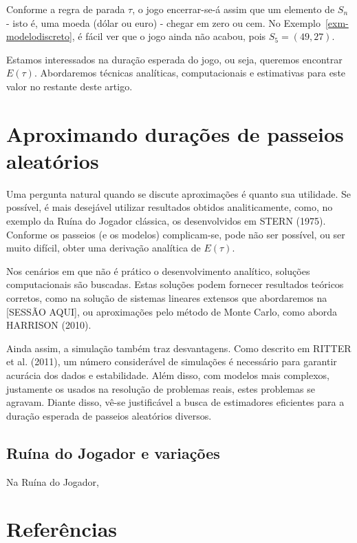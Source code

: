 \documentclass[
  brazilian,
  12pt,
]{article}
\theoremstyle{definition}
\theoremstyle{definition}
\theoremstyle{remark}
\begin{document}
Conforme a regra de parada \(\tau\), o jogo encerrar-se-á assim que um
elemento de \(S_n\) - isto é, uma moeda (dólar ou euro) - chegar em zero
ou cem. No Exemplo~\ref{exm-modelodiscreto}, é fácil ver que o jogo
ainda não acabou, pois \(S_5 = (49,
27)\).

Estamos interessados na duração esperada do jogo, ou seja, queremos
encontrar \(E(\tau)\). Abordaremos técnicas analíticas, computacionais e
estimativas para este valor no restante deste artigo.

\section{Aproximando durações de passeios
aleatórios}\label{aproximando-durauxe7uxf5es-de-passeios-aleatuxf3rios}

Uma pergunta natural quando se discute aproximações é quanto sua
utilidade. Se possível, é mais desejável utilizar resultados obtidos
analiticamente, como, no exemplo da Ruína do Jogador clássica, os
desenvolvidos em STERN (1975). Conforme os passeios (e os modelos)
complicam-se, pode não ser possível, ou ser muito difícil, obter uma
derivação analítica de \(E(\tau)\).

Nos cenários em que não é prático o desenvolvimento analítico, soluções
computacionais são buscadas. Estas soluções podem fornecer resultados
teóricos corretos, como na solução de sistemas lineares extensos que
abordaremos na {[}SESSÃO AQUI{]}, ou aproximações pelo método de Monte
Carlo, como aborda HARRISON (2010).

Ainda assim, a simulação também traz desvantagens. Como descrito em
RITTER et al. (2011), um número considerável de simulações é necessário
para garantir acurácia dos dados e estabilidade. Além disso, com modelos
mais complexos, justamente os usados na resolução de problemas reais,
estes problemas se agravam. Diante disso, vê-se justificável a busca de
estimadores eficientes para a duração esperada de passeios aleatórios
diversos.

\subsection{Ruína do Jogador e
variações}\label{ruuxedna-do-jogador-e-variauxe7uxf5es}

Na Ruína do Jogador,

\newpage{}

\section{Referências}\label{referuxeancias}
\end{document}
